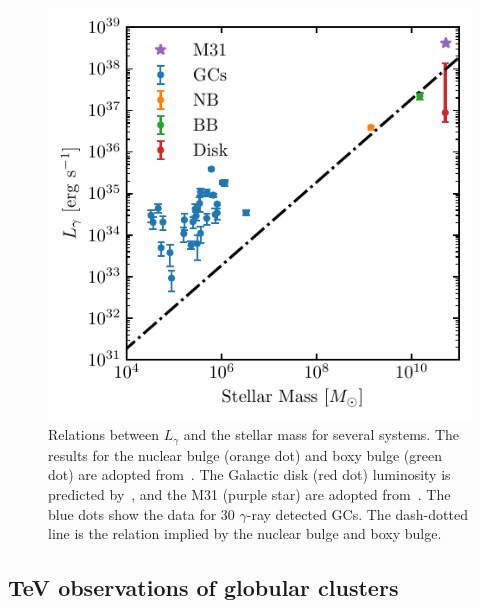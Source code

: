 \documentclass[doublespace,draft,nopageskip]{VTthesis} %
\begin{document}
\begin{figure}
    \centering
    \includegraphics[width=1\columnwidth]{Figures/Globular/mass.pdf}
    \caption{Relations between $L_\gamma$ and the stellar mass for several systems. The results for the nuclear bulge (orange dot) and boxy bulge (green dot) are adopted from~\citet{2019JCAP...09..042M}. The Galactic disk (red dot) luminosity is predicted by~\citet{2018NatAs...2..819B}, and the M31 (purple star) are adopted from~\citet{2017ApJ...836..208A}. The blue dots show the data for 30 $\gamma$-ray detected GCs. The dash-dotted line is the relation implied by the nuclear bulge and boxy bulge.}
    \label{fig:stellar_mass}
\end{figure}

\subsection{TeV observations of globular clusters}
\end{document}
